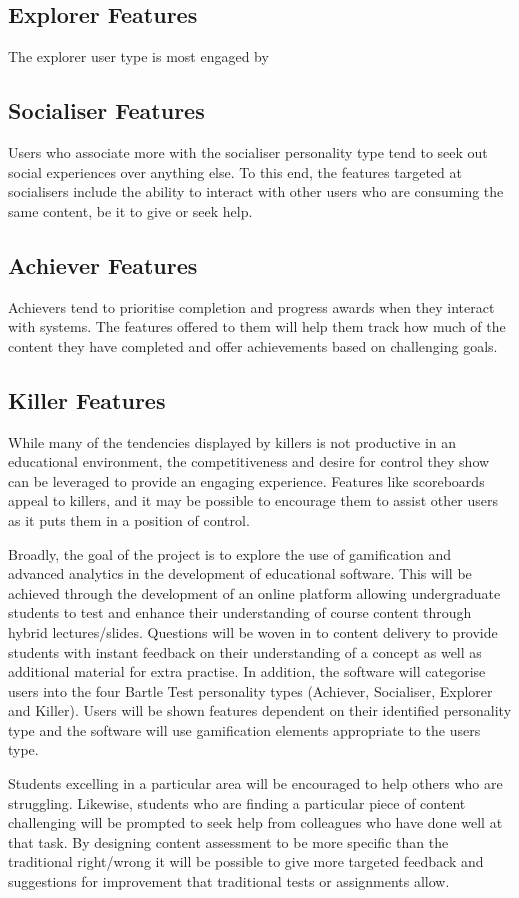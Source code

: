 \documentclass{report}
\begin{document}
\subsection*{Explorer Features}
The explorer user type is most engaged by 
\subsection*{Socialiser Features}
Users who associate more with the socialiser personality type tend to seek out social experiences over anything else. To this end, the features targeted at socialisers include the ability to interact with other users who are consuming the same content, be it to give or seek help.
\subsection*{Achiever Features}
Achievers tend to prioritise completion and progress awards when they interact with systems. The features offered to them will help them track how much of the content they have completed and offer achievements based on challenging goals.
\subsection*{Killer Features}
While many of the tendencies displayed by killers is not productive in an educational environment, the competitiveness and desire for control they show can be leveraged to provide an engaging experience. Features like scoreboards appeal to killers, and it may be possible to encourage them to assist other users as it puts them in a position of control.

Broadly, the goal of the project is to explore the use of gamification and advanced analytics in the development of educational software. This will be achieved through the development of an online platform allowing undergraduate students to test and enhance their understanding of course content through hybrid lectures/slides. Questions will be woven in to content delivery to provide students with instant feedback on their understanding of a concept as well as additional material for extra practise. In addition, the software will categorise users into the four Bartle Test personality types (Achiever, Socialiser, Explorer and Killer). Users will be shown features dependent on their identified personality type and the software will use gamification elements appropriate to the users type.

Students excelling in a particular area will be encouraged to help others who are struggling. Likewise, students who are finding a particular piece of content challenging will be prompted to seek help from colleagues who have done well at that task. By designing content assessment to be more specific than the traditional right/wrong it will be possible to give more targeted feedback and suggestions for improvement that traditional tests or assignments allow.
\end{document}

